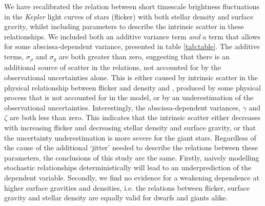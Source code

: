 
We have recalibrated the relation between short timescale brightness
fluctuations in the {\it Kepler} light curves of stars (flicker) with both
stellar density and surface gravity, whilst including parameters to describe
the intrinsic scatter in these relationships.
We included both an additive variance term {\it and} a term that allows for
some abscissa-dependent variance, presented in table \ref{tab:table}.
The additive terms, $\sigma_\rho$ and $ \sigma_g$ are both greater than zero,
suggesting that there is an additional source of scatter in the relations, not
accounted for by the observational uncertainties alone.
This is either caused by intrinsic scatter in the physical relationship
between flicker and density and \logg, produced by some physical process that
is not accounted for in the model, or by an underestimation of the
observational uncertainties.
Interestingly, the abscissa-dependent variances, $\gamma$ and $\zeta$ are both
less than zero.
This indicates that the intrinsic scatter either decreases with increasing
flicker and decreasing stellar density and surface gravity, or that the
uncertainty underestimation is more severe for the giant stars.
Regardless of the cause of the additional `jitter' needed to describe the
relations between these parameters, the conclusions of this study are the same.
Firstly, naively modelling stochastic relationships deterministically will
lead to an underprediction of the dependent variable.
Secondly, we find no evidence for a weakening dependence at higher surface
gravities and densities, i.e. the relations between flicker, surface gravity
and stellar density are equally valid for dwarfs and giants alike.

